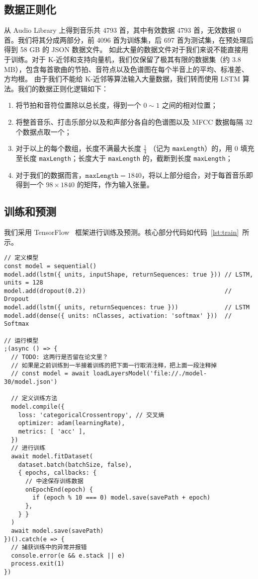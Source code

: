 \documentclass[a4paper,utf8,10pt]{article}
\newcommand{\sept}{\setlength\itemsep{-4pt}}
\begin{document}
\subsection{数据正则化}

\indent 从 Audio Library 上得到音乐共 4793 首，其中有效数据 4793 首，无效数据 0 首。我们将其分成两部分，前 4096 首为训练集，后 697 首为测试集，在预处理后得到 58 GB 的 JSON 数据文件。
如此大量的数据文件对于我们来说不能直接用于训练。对于 K-近邻和支持向量机，我们仅保留了极其有限的数据集（约 3.8 MB），包含每首歌曲的节拍、音符点以及色谱图在每个半音上的平均、标准差、方均根。
由于我们不能给 K-近邻等算法输入大量数据，我们转而使用 LSTM 算法。我们的数据正则化逻辑如下：

\begin{enumerate}
  \sept
  \item 将节拍和音符位置除以总长度，得到一个 $0 \sim 1$ 之间的相对位置；
  \item 将整首音乐、打击乐部分以及和声部分各自的色谱图以及 MFCC 数据每隔 32 个数据点取一个；
  \item 对于以上的每个数组，长度不满最大长度 $\displaystyle\frac{1}{4}$ （记为 \texttt{maxLength}）的，用 0 填充至长度 \texttt{maxLength}；长度大于 \texttt{maxLength} 的，截断到长度 \texttt{maxLength}；
  \item 对于我们的数据而言，$\mathtt{maxLength} = 1840$，将以上部分组合，对于每首音乐即得到一个 $98 \times 1840$ 的矩阵，作为输入张量。
\end{enumerate}

\subsection{训练和预测}

\noindent 我们采用 TensorFlow~\cite{tf15} 框架进行训练及预测。核心部分代码如代码~\ref{lst:train}~所示。
 \label{lst:train}
\begin{verbatim}
// 定义模型
const model = sequential()
model.add(lstm({ units, inputShape, returnSequences: true })) // LSTM, units = 128
model.add(dropout(0.2))                                       // Dropout
model.add(lstm({ units, returnSequences: true }))             // LSTM
model.add(dense({ units: nClasses, activation: 'softmax' }))  // Softmax

// 运行模型
;(async () => {
  // TODO: 这两行是否留在论文里？
  // 如果是之前训练到一半接着训练的把下面一行取消注释，把上面一段注释掉
  // const model = await loadLayersModel('file://./model-30/model.json')

  // 定义训练方法
  model.compile({
    loss: 'categoricalCrossentropy', // 交叉熵
    optimizer: adam(learningRate),
    metrics: [ 'acc' ],
  })
  // 进行训练
  await model.fitDataset(
    dataset.batch(batchSize, false),
    { epochs, callbacks: {
      // 中途保存训练数据
      onEpochEnd(epoch) {
        if (epoch % 10 === 0) model.save(savePath + epoch)
      },
    } }
  )
  await model.save(savePath)
})().catch(e => {
  // 捕获训练中的异常并报错
  console.error(e && e.stack || e)
  process.exit(1)
})
\end{verbatim}
\end{document}
